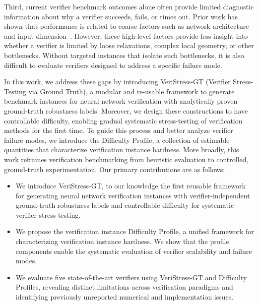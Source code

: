 \documentclass{article}
\theoremstyle{definition}
\begin{document}

Third, current verifier benchmark outcomes alone often provide limited diagnostic information about why a verifier succeeds, fails, or times out. Prior work has shown that performance is related to coarse factors such as network architecture and input dimension~\citep{GDVB}. However, these high-level factors provide less insight into whether a verifier is limited by loose relaxations, complex local geometry, or other bottlenecks. Without targeted instances that isolate such bottlenecks, it is also difficult to evaluate verifiers designed to address a specific failure mode.

In this work, we address these gaps by introducing VeriStress-GT (Verifier Stress-Testing via Ground Truth), a modular and re-usable framework to generate benchmark instances for neural network verification with analytically proven ground-truth robustness labels. Moreover, we design these constructions to have controllable difficulty, enabling gradual systematic stress-testing of verification methods for the first time. To guide this process and better analyze verifier failure modes, we introduce the Difficulty Profile, a collection of estimable quantities that characterize verification instance hardness. More broadly, this work reframes verification benchmarking from heuristic evaluation to controlled, ground-truth experimentation. Our primary contributions are as follows: 

\begin{itemize}[leftmargin=*]

    \item We introduce VeriStress-GT, to our knowledge the first reusable framework for generating neural network verification instances with verifier-independent ground-truth robustness labels and controllable difficulty for systematic verifier stress-testing. 
    
    \item We propose the verification instance Difficulty Profile, a unified framework for characterizing verification instance hardness. We show that the profile components enable the systematic evaluation of verifier scalability and failure modes. 
    
    \item We evaluate five state-of-the-art verifiers using VeriStress-GT and Difficulty Profiles, revealing distinct limitations across verification paradigms and identifying previously unreported numerical and implementation issues. 
\end{itemize} 
\end{document}
